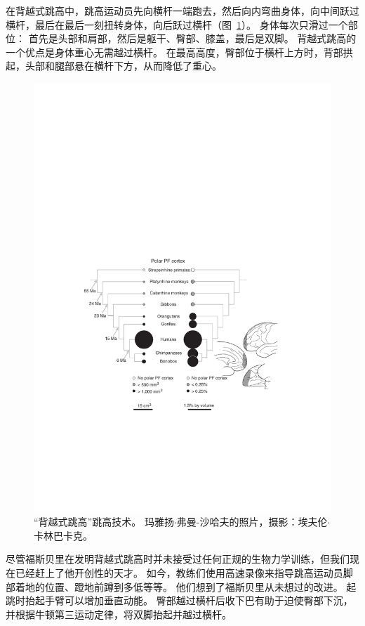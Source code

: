 在背越式跳高中，跳高运动员先向横杆一端跑去，然后向内弯曲身体，向中间跃过横杆，最后在最后一刻扭转身体，向后跃过横杆（图~\ref{fig:9_1}）。
身体每次只滑过一个部位：
首先是头部和肩部，然后是躯干、臀部、膝盖，最后是双脚。
背越式跳高的一个优点是身体重心无需越过横杆。
在最高高度，臀部位于横杆上方时，背部拱起，头部和腿部悬在横杆下方，从而降低了重心。


\begin{figure}[!htb]
	\centering
	\includegraphics[width=1.0\linewidth]{chap9/9_1}
	\caption{“背越式跳高”跳高技术。
		玛雅扬$\cdot$弗曼-沙哈夫的照片，摄影：埃夫伦$\cdot$卡林巴卡克。 \label{fig:9_1}}
\end{figure}


尽管福斯贝里在发明背越式跳高时并未接受过任何正规的生物力学训练，但我们现在已经赶上了他开创性的天才。
如今，教练们使用高速录像来指导跳高运动员脚部着地的位置、蹬地前蹲到多低等等。
他们想到了福斯贝里从未想过的改进。
起跳时抬起手臂可以增加垂直动能。
臀部越过横杆后收下巴有助于迫使臀部下沉，并根据牛顿第三运动定律，将双脚抬起并越过横杆。


